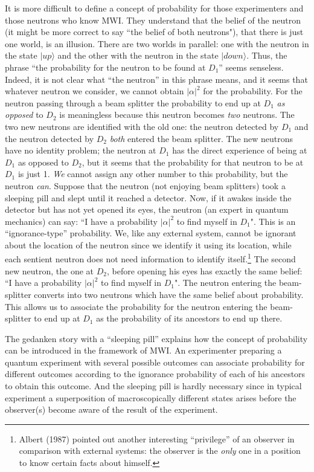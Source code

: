 It is more difficult to define a concept of probability for those
experimenters and those neutrons who know MWI. They understand that
the belief of the neutron (it might be more correct to say ``the
belief of both neutrons"), that there is just one world, is an
illusion.  There are two worlds in parallel: one with the neutron in
the state $|up\rangle$ and the other with the neutron in the state
$|down\rangle$.  Thus, the phrase ``the probability for the neutron to
be found at $D_1$'' seems senseless.  Indeed, it is not clear what
``the neutron'' in this phrase means, and it seems that whatever
neutron we consider, we cannot obtain $|\alpha|^2$ for the
probability. For the neutron passing through a beam splitter the
probability to end up at $D_1$ {\it as opposed} to $D_2$ is
meaningless because this neutron becomes {\it two} neutrons.  The two
new neutrons are identified with the old one: the neutron detected by
$D_1$ and the neutron detected by $D_2$ {\it both} entered the beam
splitter.  The new neutrons have no identity problem; the neutron at
$D_1$ has the direct experience of being at $D_1$ as opposed to $D_2$,
but it seems that the probability for that neutron to be at $D_1$ is
just 1.  {\it We} cannot assign any other number to this probability,
but the neutron {\it can}.  Suppose that the neutron (not enjoying
beam splitters) took a sleeping pill and slept until it reached a
detector.  Now, if it awakes inside the detector but has not yet
opened its eyes, the neutron (an expert in quantum mechanics) can say:
``I have a probability $|\alpha|^2$ to find myself in $D_1$".  This is
an ``ignorance-type'' probability. We, like any external system,
cannot be ignorant about the location of the neutron since we identify
it using its location, while each sentient neutron does not need
information to identify itself.\footnote{Albert (1987) pointed out
  another interesting ``privilege'' of an observer in comparison with
  external systems: the observer is the {\it only} one in a position
  to know certain facts about himself.} The second new neutron, the
one at $D_2$, before opening his eyes has exactly the same belief: ``I
have a probability $|\alpha|^2$ to find myself in $D_1$". The neutron
entering the beam-splitter converts into two neutrons which have the
same belief about probability. This allows us to associate the
probability for the neutron entering the beam-splitter to end up at
$D_1$ as the probability of its ancestors to end up there.

The gedanken story with a ``sleeping pill'' explains how the concept
of probability can be introduced in the framework of MWI. An
experimenter preparing a quantum experiment with several possible
outcomes can associate probability for different outcomes according to
the ignorance probability of each of his ancestors to obtain this
outcome. And the sleeping pill is hardly necessary since in typical
experiment a superposition of macroscopically different states arises
before the observer(s) become aware of the result of the experiment.




